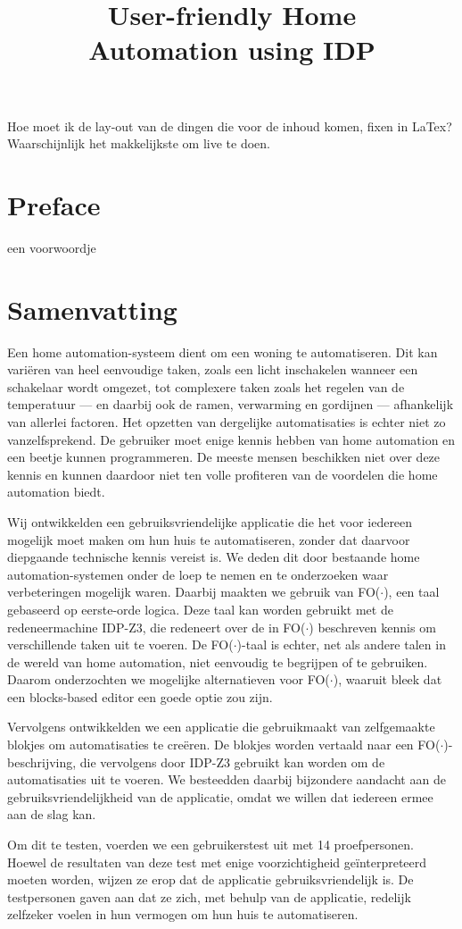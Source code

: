 \documentclass[11pt,a4paper]{report}
\title{User-friendly Home\\ Automation using IDP}
\subtitle{}
\newcommand{\fodot}{FO($\cdot$)\xspace}
\begin{document}
\preface%
Hoe moet ik de lay-out van de dingen die voor de inhoud komen, fixen in LaTex? Waarschijnlijk het makkelijkste om live te doen.
\section*{Preface}
een voorwoordje

\section*{Samenvatting}
Een home automation-systeem dient om een woning te automatiseren. Dit kan variëren van heel eenvoudige taken, zoals een licht inschakelen wanneer een schakelaar wordt omgezet, tot complexere taken zoals het regelen van de temperatuur — en daarbij ook de ramen, verwarming en gordijnen — afhankelijk van allerlei factoren. Het opzetten van dergelijke automatisaties is echter niet zo vanzelfsprekend. De gebruiker moet enige kennis hebben van home automation en een beetje kunnen programmeren. De meeste mensen beschikken niet over deze kennis en kunnen daardoor niet ten volle profiteren van de voordelen die home automation biedt.

Wij ontwikkelden een gebruiksvriendelijke applicatie die het voor iedereen mogelijk moet maken om hun huis te automatiseren, zonder dat daarvoor diepgaande technische kennis vereist is. We deden dit door bestaande home automation-systemen onder de loep te nemen en te onderzoeken waar verbeteringen mogelijk waren. Daarbij maakten we gebruik van \fodot, een taal gebaseerd op eerste-orde logica. Deze taal kan worden gebruikt met de redeneermachine IDP-Z3, die redeneert over de in \fodot beschreven kennis om verschillende taken uit te voeren. De \fodot-taal is echter, net als andere talen in de wereld van home automation, niet eenvoudig te begrijpen of te gebruiken. Daarom onderzochten we mogelijke alternatieven voor \fodot, waaruit bleek dat een blocks-based editor een goede optie zou zijn.

Vervolgens ontwikkelden we een applicatie die gebruikmaakt van zelfgemaakte blokjes om automatisaties te creëren. De blokjes worden vertaald naar een \fodot-beschrijving, die vervolgens door IDP-Z3 gebruikt kan worden om de automatisaties uit te voeren. We besteedden daarbij bijzondere aandacht aan de gebruiksvriendelijkheid van de applicatie, omdat we willen dat iedereen ermee aan de slag kan.

Om dit te testen, voerden we een gebruikerstest uit met 14 proefpersonen. Hoewel de resultaten van deze test met enige voorzichtigheid ge\"interpreteerd moeten worden, wijzen ze erop dat de applicatie gebruiksvriendelijk is. De testpersonen gaven aan dat ze zich, met behulp van de applicatie, redelijk zelfzeker voelen in hun vermogen om hun huis te automatiseren.
\end{document}
